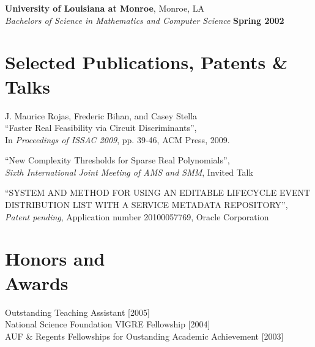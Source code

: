 \documentclass[margin,line,12pt]{resume}
\begin{document}
\begin{resume}
    \textbf{University of Louisiana at Monroe}, Monroe, LA \vspace{2mm}\\\vspace{1mm}%
    \textsl{Bachelors of Science in Mathematics and Computer Science} \hfill \textbf{ Spring 2002}\vspace{-3mm}\\\vspace{-1mm}%

    \section{\mysidestyle Selected Publications, Patents \& Talks}

    J. Maurice Rojas, Frederic Bihan, and Casey Stella\\
    ``Faster Real Feasibility via Circuit Discriminants'',\\
    In \textsl{Proceedings of ISSAC 2009}, pp. 39-46, ACM Press, 2009.

\vspace{-2mm}
    ``New Complexity Thresholds for Sparse Real Polynomials'',\\
    \textsl{Sixth International Joint Meeting of AMS and SMM}, Invited Talk

    ``SYSTEM AND METHOD FOR USING AN EDITABLE LIFECYCLE EVENT DISTRIBUTION LIST WITH A SERVICE METADATA REPOSITORY'',\\
    \textsl{Patent pending}, Application number 20100057769, Oracle Corporation
    
    \section{\mysidestyle Honors and\\Awards} 

    Outstanding Teaching Assistant [2005]                                                           \vspace{1mm}\\
    National Science Foundation VIGRE Fellowship [2004]                                             \vspace{1mm}\\
    AUF \& Regents Fellowships for Oustanding Academic Achievement [2003]                           


\end{resume}
\end{document}
